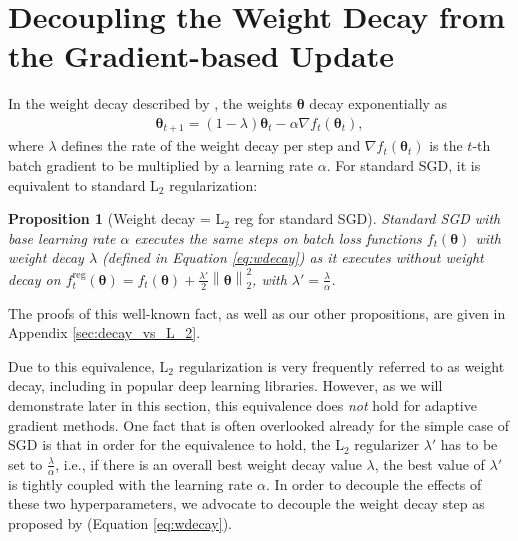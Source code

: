 \documentclass[usenames,dvipsnames]{article} %
\newcommand{\norm}[1]{\left\lVert#1\right\rVert}
\newtheorem{prop}{Proposition}
\begin{document}
\section{Decoupling the Weight Decay from the Gradient-based Update}
\label{sec:decoupling}

In the weight decay described by \citet{hanson1988comparing}, the weights $\bm{\theta}$  decay exponentially as 
%
\begin{eqnarray}
	\bm{\theta}_{t+1} = (1 - \lambda) \bm{\theta}_t - \alpha \nabla f_t(\bm{\theta}_t), \label{eq:wdecay}
\end{eqnarray}
%
where $\lambda$ defines the rate of the weight decay per step and $\nabla f_t(\bm{\theta}_t)$ is the $t$-th batch gradient to be multiplied by a learning rate $\alpha$.
For standard SGD, %
it is equivalent to standard L$_2$ regularization: 
\begin{prop}[Weight decay = L$_2$ reg for standard SGD]
Standard SGD with base learning rate $\alpha$ executes the same steps on batch loss functions $f_t(\bm{\theta})$ with weight decay $\lambda$ (defined in Equation \ref{eq:wdecay}) as it executes without weight decay on $f_{t}^{\text{reg}}(\bm{\theta}) = f_t(\bm{\theta}) + \frac{\lambda'}{2} \norm{\bm{\theta}}_2^2$, with $\lambda' = \frac{\lambda}{\alpha}$.
\end{prop}
The proofs of this well-known fact, as well as our other propositions, are given in Appendix \ref{sec:decay_vs_L_2}.

Due to this equivalence, L$_2$ regularization is very frequently referred to as weight decay, including in popular deep learning libraries. However, as we will demonstrate later in this section, this equivalence does \emph{not} hold for adaptive gradient methods. 
One fact that is often overlooked already for the simple case of SGD is that in order for the equivalence to hold, the L$_2$ regularizer $\lambda'$ has to be set to $\frac{\lambda}{\alpha}$, i.e., if there is an overall best weight decay value $\lambda$, the best value of $\lambda'$ is tightly coupled with the learning rate $\alpha$. 
In order to decouple the effects of these two hyperparameters, we advocate to decouple the weight decay step as proposed by \citet{hanson1988comparing} (Equation \ref{eq:wdecay}).
\end{document}
